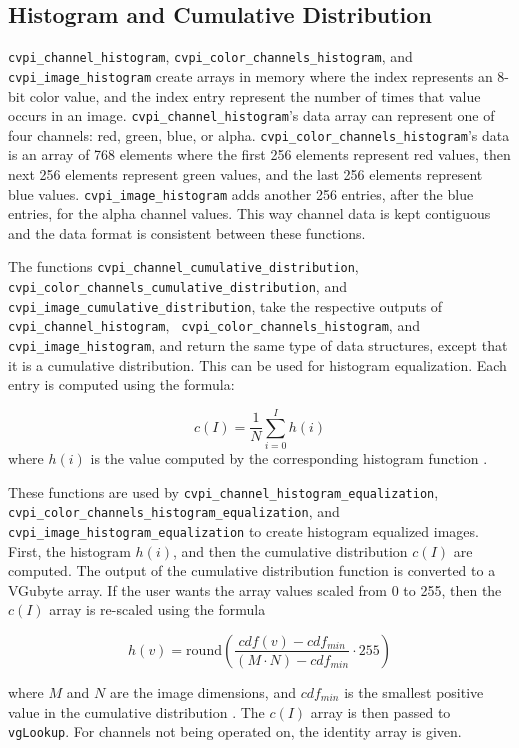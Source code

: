 \documentclass[12pt]{report}
\begin{document}
\subsection{Histogram and Cumulative Distribution}
\label{sec-3-11-4}
{\tt cvpi\_channel\_histogram}, {\tt cvpi\_color\_\-channels\_histogram}, and
{\tt cvpi\_image\_histogram} create arrays in memory where the index
represents an 8-bit color value, and the index entry represent the
number of times that value occurs in an image.
{\tt cvpi\_channel\_histogram}'s data array can represent one of four
channels: red, green, blue, or
alpha. {\tt cvpi\_color\_\-channels\_histogram}'s data is an array of 768
elements where the first 256 elements represent red values, then
next 256 elements represent green values, and the last 256
elements represent blue values. {\tt cvpi\_image\_histogram} adds
another 256 entries, after the blue entries, for the alpha channel
values. This way channel data is kept contiguous and the data
format is consistent between these functions.

The functions {\tt cvpi\_channel\_\-cumulative\_\-distribution}, {\tt
  cvpi\_color\_\-channels\_\-cumulative\_\-distribution}, and {\tt
  cvpi\_image\_\-cumulative\_distribution}, take the respective
outputs of {\tt cvpi\_channel\_histogram}, {\tt
  cvpi\_color\_\-channels\_histogram}, and {\tt
  cvpi\_image\_histogram}, and return the same type of data
structures, except that it is a cumulative distribution. This can be
used for histogram equalization. Each entry is computed using the
formula:

\[c(I) = \frac{1}{N}\sum_{i=0}^Ih(i)\]
where $h(i)$ is the value computed by the corresponding histogram
function \cite[p.~95]{Szeliski}.

These functions are used by {\tt cvpi\_channel\_\-histogram\_equalization},
{\tt cvpi\_color\_\-channels\_\-histogram\_equalization}, and
{\tt cvpi\_image\_\-histogram\_equalization} to create histogram equalized
images. First, the histogram $h(i)$, and then the cumulative
distribution $c(I)$ are computed. The output of the cumulative
distribution function is converted to a VGubyte array. If the user
wants the array values scaled from 0 to 255, then the $c(I)$ array
is re-scaled using the formula

\[h(v)=\mathrm{round}\left(\frac{cdf(v)- cdf_{min}}{(M\cdot N) - cdf_{min}}\cdot 255\right)\]

where $M$ and $N$ are the image dimensions, and $cdf_{min}$ is the
smallest positive value in the cumulative distribution
\cite{wiki:HistogramEqualization}. The $c(I)$ array is then passed to
{\tt vgLookup}. For channels not being operated on, the identity array
is given.
\end{document}
